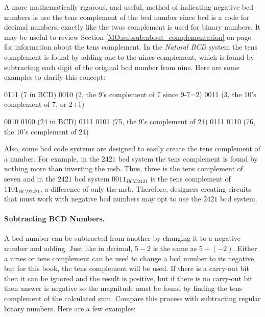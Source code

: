A more mathematically rigorous, and useful, method of indicating negative \gls{bcd} numbers is use the tens complement of the \gls{bcd} number since \gls{bcd} is a code for decimal numbers, exactly like the twos complement is used for binary numbers. It may be useful to review Section \ref{MO:subsub:about_complementation} on page \pageref{MO:subsub:about_complementation} for information about the tens complement. In the \emph{Natural BCD} system the tens complement is found by adding one to the nines complement, which is found by subtracting each digit of the original \gls{bcd} number from nine. Here are some examples to clarify this concept:

\begin{binDisp}[commandchars=~\[\]]
    0111 (7 in BCD)
    0010 (2, the 9's complement of 7 since 9-7=2)
    0011 (3, the 10's complement of 7, or 2+1)
\end{binDisp}

\begin{binDisp}[commandchars=~\[\]]
    0010 0100 (24 in BCD)
    0111 0101 (75, the 9's complement of 24)
    0111 0110 (76, the 10's complement of 24)
\end{binDisp}

Also, some \gls{bcd} code systems are designed to easily create the tens complement of a number. For example, in the $ 2421 $ \gls{bcd} system the tens complement is found by nothing more than inverting the \gls{msb}. Thus, three is the tens complement of seven and in the $ 2421 $ \gls{bcd} system $ 0011_{BCD2421} $ is the tens complement of $ 1101_{BCD2421} $, a difference of only the \gls{msb}. Therefore, designers creating circuits that must work with negative \gls{bcd} numbers may opt to use the $ 2421 $ \gls{bcd} system.

\paragraph{Subtracting BCD Numbers.} A \gls{bcd} number can be subtracted from another by changing it to a negative number and adding. Just like in decimal, $ 5 - 2 $ is the same as $ 5 + (-2) $. Either a nines or tens complement can be used to change a \gls{bcd} number to its negative, but for this book, the tens complement will be used. If there is a carry-out bit then it can be ignored and the result is positive, but if there is no carry-out bit then answer is negative so the magnitude must be found by finding the tens complement of the calculated sum. Compare this process with subtracting regular binary numbers. Here are a few examples:

